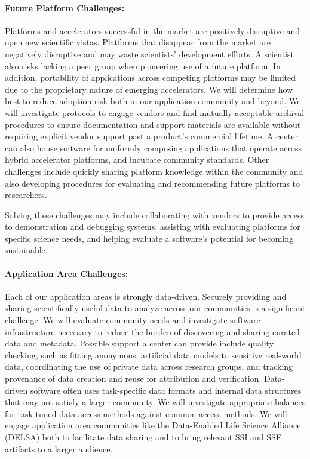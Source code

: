 \paragraph{Future Platform Challenges:} Platforms and accelerators successful in the market are positively
disruptive and open new scientific vistas. Platforms that disappear from the market are negatively
disruptive and may waste scientists’ development efforts. A scientist also risks lacking a peer group
when pioneering use of a future platform. In addition, portability of applications across competing
platforms may be limited due to the proprietary nature of emerging accelerators.
We will determine how best to reduce adoption risk both in our application community and
beyond. We will investigate protocols to engage vendors and find mutually acceptable archival
procedures to ensure documentation and support materials are available without requiring explicit
vendor support past a product’s commercial lifetime. A center can also house software for uniformly
composing applications that operate across hybrid accelerator platforms, and incubate community
standards. Other challenges include quickly sharing platform knowledge within the community
and also developing procedures for evaluating and recommending future platforms to researchers.

Solving these challenges may include collaborating with vendors to provide access to demonstration
and debugging systems, assisting with evaluating platforms for specific science needs, and helping
evaluate a software’s potential for becoming sustainable.

\paragraph{Application Area Challenges:} Each of our application areas is strongly data-driven. Securely
providing and sharing scientifically useful data to analyze across our communities is a significant
challenge. We will evaluate community needs and investigate software infrastructure necessary
to reduce the burden of discovering and sharing curated data and metadata. Possible support a
center can provide include quality checking, such as fitting anonymous, artificial data models to sensitive real-world data, coordinating the use of private data across research groups, and tracking
provenance of data creation and reuse for attribution and verification.
Data-driven software often uses task-specific data formats and internal data structures that may
not satisfy a larger community. We will investigate appropriate balances for task-tuned data access
methods against common access methods. We will engage application area communities like the
Data-Enabled Life Science Alliance (DELSA) both to facilitate data sharing and to bring relevant
SSI and SSE artifacts to a larger audience.

